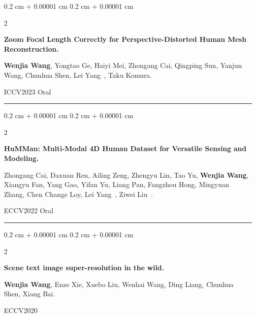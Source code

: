 \documentclass[10pt, letterpaper]{article}
\newenvironment{onecolentry}{
    \begin{adjustwidth}{
        0.2 cm + 0.00001 cm
    }{
        0.2 cm + 0.00001 cm
    }
}{
    \end{adjustwidth}
} %
\newenvironment{twocolentry}[2][]{
    \onecolentry
    \def\secondColumn{#2}
    \setcolumnwidth{\fill, 4.5 cm}
    \begin{paracol}{2}
}{
    \switchcolumn \raggedleft \secondColumn
    \end{paracol}
    \endonecolentry
} %
\let\hrefWithoutArrow\href
\renewcommand{\href}[2]{\hrefWithoutArrow{#1}{\ifthenelse{\equal{#2}{}}{ }{#2 }\raisebox{.15ex}{\footnotesize \faExternalLink*}}}
\begin{document}
        \begin{samepage}
            \begin{twocolentry}{
                ICCV2023 Oral
            }
                \textbf{Zoom Focal Length Correctly for Perspective-Distorted Human Mesh Reconstruction. }

                \vspace{0.10 cm}
                \small\textbf{Wenjia Wang}, Yongtao Ge, Haiyi Mei, Zhongang Cai, Qingping Sun, Yanjun Wang, Chunhua Shen, Lei Yang~\Letter, Taku Komura.
            \end{twocolentry}


            \vspace{0.15 cm}

        \end{samepage}
{\color{gray!40}\noindent\rule{0.98\textwidth}{0.3pt}}
        \begin{samepage}
            \begin{twocolentry}{
                ECCV2022 Oral
            }
                \textbf{HuMMan: Multi-Modal 4D Human Dataset for Versatile Sensing and Modeling.}

                \vspace{0.10 cm}
                \small Zhongang Cai, Daxuan Ren, Ailing Zeng, Zhengyu Lin, Tao Yu, \textbf{Wenjia Wang}, Xiangyu Fan, Yang Gao, Yifan Yu, Liang Pan, Fangzhou Hong, Mingyuan Zhang, Chen Change Loy, Lei Yang~\Letter, Ziwei Liu~\Letter.
            \end{twocolentry}


            \vspace{-0.15 cm}

        \end{samepage}

{\color{gray!40}\noindent\rule{0.98\textwidth}{0.3pt}}


        \begin{samepage}
            \begin{twocolentry}{
                ECCV2020
            }
                \textbf{Scene text image super-resolution in the wild.}

                \vspace{0.10 cm}
                \small \textbf{Wenjia Wang}, Enze Xie, Xuebo Liu, Wenhai Wang, Ding Liang, Chunhua Shen, Xiang Bai.
            \end{twocolentry}


            \vspace{-0.15 cm}


        \end{samepage}
\end{document}
